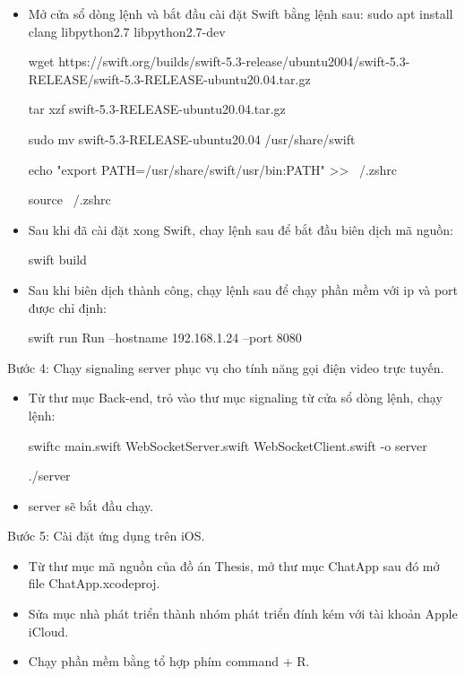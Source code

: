 \documentclass[../DoAn.tex]{subfiles}
\begin{document}
\begin{itemize}
    \item Mở cửa sổ dòng lệnh và bắt đầu cài đặt Swift bằng lệnh sau:
    sudo apt install clang libpython2.7 libpython2.7-dev
    
    wget https://swift.org/builds/swift-5.3-release/ubuntu2004/swift-5.3-RELEASE/swift-5.3-RELEASE-ubuntu20.04.tar.gz
    
    tar xzf swift-5.3-RELEASE-ubuntu20.04.tar.gz
    
    sudo mv swift-5.3-RELEASE-ubuntu20.04 /usr/share/swift

    echo "export PATH=/usr/share/swift/usr/bin:PATH" >> ~/.zshrc 
    
    source ~/.zshrc

    \item Sau khi đã cài đặt xong Swift, chay lệnh sau để bắt đầu biên dịch mã nguồn:
    
    swift build

    \item Sau khi biên dịch thành công, chạy lệnh sau để chạy phần mềm với ip và port được chỉ định:

    swift run Run --hostname 192.168.1.24 --port 8080

\end{itemize}

Bước 4: Chạy signaling server phục vụ cho tính năng gọi điện video trực tuyến.
\begin{itemize}
    \item Từ thư mục Back-end, trỏ vào thư mục signaling từ cửa sổ dòng lệnh, chạy lệnh:
    
    swiftc main.swift WebSocketServer.swift WebSocketClient.swift -o server
    
    ./server

    \item server sẽ bắt đầu chạy.
\end{itemize}

Bước 5: Cài đặt ứng dụng trên iOS.
\begin{itemize}
    \item Từ thư mục mã nguồn của đồ án Thesis, mở thư mục ChatApp sau đó mở file ChatApp.xcodeproj.
    
    \item Sửa mục nhà phát triển thành nhóm phát triển đính kém với tài khoản Apple iCloud.

    \item Chạy phần mềm bằng tổ hợp phím command + R.
\end{itemize}
\end{document}
